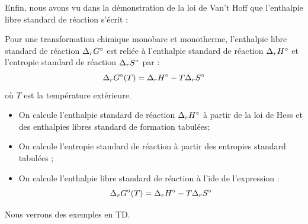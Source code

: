 \documentclass[11pt,fleqn]{book} %
\begin{document}
Enfin, nous avons vu dans la démonstration de la loi de Van't Hoff que l'enthalpie libre standard de réaction s'écrit :
\begin{proposition}
    Pour une transformation chimique monobare et monotherme, l'enthalpie libre standard de réaction $\Delta_r G\degree$ est reliée à l'enthalpie standard de réaction $\Delta_r H\degree$ et l'entropie standard de réaction $\Delta_r S\degree$ par :
    \begin{equation}
        \Delta_r G\degree(T) = \Delta_r H\degree - T \Delta_r S\degree
    \end{equation}
    où $T$ est la température extérieure.
\end{proposition}

\begin{encart}
    \begin{itemize}
        \item On calcule l'enthalpie standard de réaction $\Delta_r H\degree$ à partir de la loi de Hess et des enthalpies libres standard de formation tabulées;
        \item On calcule l'entropie standard de réaction à partir des entropies standard tabulées ;
        \item On calcule l'enthalpie libre standard de réaction à l'ide de l'expression :
        \begin{equation}
            \Delta_r G\degree(T) = \Delta_r H\degree - T \Delta_r S\degree
        \end{equation}
    \end{itemize}
    Nous verrons des exemples en TD.
\end{encart}
\end{document}

